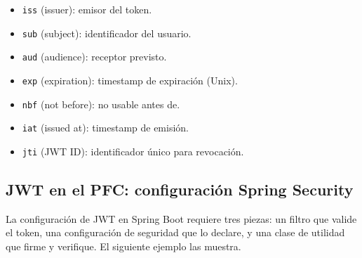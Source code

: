 \documentclass[11pt,a4paper,openany]{book}
\begin{document}
\begin{itemize}
\item \texttt{iss} (issuer): emisor del token.
\item \texttt{sub} (subject): identificador del usuario.
\item \texttt{aud} (audience): receptor previsto.
\item \texttt{exp} (expiration): timestamp de expiración (Unix).
\item \texttt{nbf} (not before): no usable antes de.
\item \texttt{iat} (issued at): timestamp de emisión.
\item \texttt{jti} (JWT ID): identificador único para revocación.
\end{itemize}

\subsection{JWT en el PFC: configuración Spring Security}

La configuración de JWT en Spring Boot requiere tres piezas:
un filtro que valide el token, una configuración de seguridad que lo
declare, y una clase de utilidad que firme y verifique. El siguiente
ejemplo las muestra.
\end{document}
